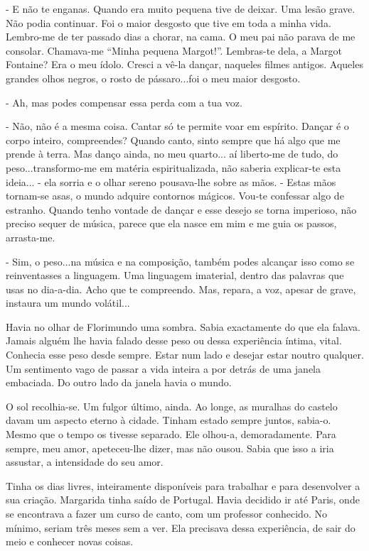 - E não te enganas. Quando era muito pequena tive de deixar. Uma lesão
grave. Não podia continuar. Foi o maior desgosto que tive em toda a
minha vida. Lembro-me de ter passado dias a chorar, na cama. O meu pai
não parava de me consolar. Chamava-me ``Minha pequena Margot!''.
Lembras-te dela, a Margot Fontaine? Era o meu ídolo. Cresci a vê-la
dançar, naqueles filmes antigos. Aqueles grandes olhos negros, o rosto
de pássaro...foi o meu maior desgosto.

- Ah, mas podes compensar essa perda com a tua voz.

- Não, não é a mesma coisa. Cantar só te permite voar em espírito.
Dançar é o corpo inteiro, compreendes? Quando canto, sinto sempre que há
algo que me prende à terra. Mas danço ainda, no meu quarto... aí
liberto-me de tudo, do peso...transformo-me em matéria espiritualizada,
não saberia explicar-te esta ideia... - ela sorria e o olhar sereno
pousava-lhe sobre as mãos. - Estas mãos tornam-se asas, o mundo adquire
contornos mágicos. Vou-te confessar algo de estranho. Quando tenho
vontade de dançar e esse desejo se torna imperioso, não preciso sequer
de música, parece que ela nasce em mim e me guia os passos, arrasta-me.

- Sim, o peso...na música e na composição, também podes alcançar isso
como se reinventasses a linguagem. Uma linguagem imaterial, dentro das
palavras que usas no dia-a-dia. Acho que te compreendo. Mas, repara, a
voz, apesar de grave, instaura um mundo volátil...

Havia no olhar de Florimundo uma sombra. Sabia exactamente do que ela
falava. Jamais alguém lhe havia falado desse peso ou dessa experiência
íntima, vital. Conhecia esse peso desde sempre. Estar num lado e desejar
estar noutro qualquer. Um sentimento vago de passar a vida inteira a por
detrás de uma janela embaciada. Do outro lado da janela havia o mundo.

O sol recolhia-se. Um fulgor último, ainda. Ao longe, as muralhas do
castelo davam um aspecto eterno à cidade. Tinham estado sempre juntos,
sabia-o. Mesmo que o tempo os tivesse separado. Ele olhou-a,
demoradamente. Para sempre, meu amor, apeteceu-lhe dizer, mas não ousou.
Sabia que isso a iria assustar, a intensidade do seu amor.

Tinha os dias livres, inteiramente disponíveis para trabalhar e para
desenvolver a sua criação. Margarida tinha saído de Portugal. Havia
decidido ir até Paris, onde se encontrava a fazer um curso de canto, com
um professor conhecido. No mínimo, seriam três meses sem a ver. Ela
precisava dessa experiência, de sair do meio e conhecer novas coisas.

